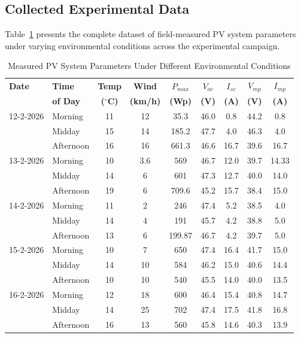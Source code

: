 \subsection{Collected Experimental Data}

Table~\ref{tab:measured_data} presents the complete dataset of field-measured PV system parameters under varying environmental conditions across the experimental campaign.

\begin{table}[H]
\centering
\caption{Measured PV System Parameters Under Different Environmental Conditions}
\label{tab:measured_data}
\small
\begin{tabular}{@{}l l c c c c c c c@{}}
\toprule
\textbf{Date} & \textbf{Time} & \textbf{Temp} & \textbf{Wind} & \textbf{$P_{max}$} & \textbf{$V_{oc}$} & \textbf{$I_{sc}$} & \textbf{$V_{mp}$} & \textbf{$I_{mp}$} \\
 & \textbf{of Day} & \textbf{($^{\circ}$C)} & \textbf{(km/h)} & \textbf{(Wp)} & \textbf{(V)} & \textbf{(A)} & \textbf{(V)} & \textbf{(A)} \\
\midrule
12-2-2026 & Morning & 11 & 12 & 35.3 & 46.0 & 0.8 & 44.2 & 0.8 \\
 & Midday & 15 & 14 & 185.2 & 47.7 & 4.0 & 46.3 & 4.0 \\
 & Afternoon & 16 & 16 & 661.3 & 46.6 & 16.7 & 39.6 & 16.7 \\
\midrule
13-2-2026 & Morning & 10 & 3.6 & 569 & 46.7 & 12.0 & 39.7 & 14.33 \\
 & Midday & 14 & 6 & 601 & 47.3 & 12.7 & 40.0 & 14.0 \\
 & Afternoon & 19 & 6 & 709.6 & 45.2 & 15.7 & 38.4 & 15.0 \\
\midrule
14-2-2026 & Morning & 11 & 2 & 246 & 47.4 & 5.2 & 38.5 & 4.0 \\
 & Midday & 14 & 4 & 191 & 45.7 & 4.2 & 38.8 & 5.0 \\
 & Afternoon & 13 & 6 & 199.87 & 46.7 & 4.2 & 39.7 & 5.0 \\
\midrule
15-2-2026 & Morning & 10 & 7 & 650 & 47.4 & 16.4 & 41.7 & 15.0 \\
 & Midday & 14 & 10 & 584 & 46.2 & 15.0 & 40.6 & 14.4 \\
 & Afternoon & 10 & 10 & 540 & 45.5 & 14.0 & 40.0 & 13.5 \\
\midrule
16-2-2026 & Morning & 12 & 18 & 600 & 46.4 & 15.4 & 40.8 & 14.7 \\
 & Midday & 14 & 25 & 702 & 47.4 & 17.5 & 41.8 & 16.8 \\
 & Afternoon & 16 & 13 & 560 & 45.8 & 14.6 & 40.3 & 13.9 \\

\end{tabular}
\end{table}
